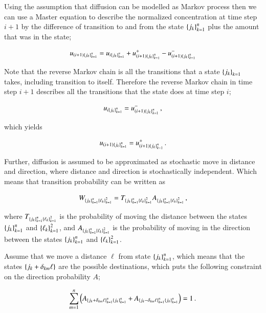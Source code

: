 \documentclass[11pt,english,a4paper]{article}
\begin{document}
\begin{flushleft}
Using the assumption that diffusion can be modelled as Markov process then we can use a Master equation to describe the normalized concentration at time step $i+1$ by the difference of transition to and from the state $\left\lbrace{j_k}\right\rbrace_{k=1}^n$ plus the amount that was in the state; 

\begin{align}
u_{(i+1)\left\lbrace{j_k}\right\rbrace_{k=1}^n} = u_{i\left\lbrace{j_k}\right\rbrace_{k=1}^n} +  u_{(i+1)\left\lbrace{j_k}\right\rbrace_{k=1}^n}^+ - u_{(i+1)\left\lbrace{j_k}\right\rbrace_{k=1}^n}^-
\label{eq_39}
\end{align} 

Note that the reverse Markov chain is all the transitions that a state $\left\lbrace{j_k}\right\rbrace_{k=1}$ takes, including transition to itself. Therefore the reverse Markov chain in time step $i+1$ describes all the transitions that the state does at time step $i$;

\begin{align*}
u_{i\left\lbrace{j_k}\right\rbrace_{k=1}^n} =  u_{(i+1)\left\lbrace{j_k}\right\rbrace_{k=1}^n}^- \,,
\end{align*}


which yields

\begin{align}
u_{(i+1)\left\lbrace{j_k}\right\rbrace_{k=1}^n} = u_{(i+1)\left\lbrace{j_k}\right\rbrace_{k=1}^n}^+ \,.
\label{eq_40}
\end{align}

Further, diffusion is assumed to be approximated as stochastic move in distance and direction, where distance and direction is stochastically independent. Which means that transition probability can be written as

\begin{align}
W_{\left\lbrace{j_k}\right\rbrace_{k=1}^n\left\lbrace{\ell_k}\right\rbrace_{k=1}^2} = T_{\left\lbrace{j_k}\right\rbrace_{k=1}^n\left\lbrace{\ell_k}\right\rbrace_{k=1}^2} A_{\left\lbrace{j_k}\right\rbrace_{k=1}^n\left\lbrace{\ell_k}\right\rbrace_{k=1}^2} \,,
\label{eq_41}
\end{align}

where $T_{\left\lbrace{j_k}\right\rbrace_{k=1}^n\left\lbrace{\ell_k}\right\rbrace_{k=1}^2}$ is the probability of moving the distance between the states $\left\lbrace{j_k}\right\rbrace_{k=1}^n$ and $\left\lbrace{\ell_k}\right\rbrace_{k=1}^2$, and $ A_{\left\lbrace{j_k}\right\rbrace_{k=1}^n\left\lbrace{\ell_k}\right\rbrace_{k=1}^2}$ is the probability of moving in the direction between the states $\left\lbrace{j_k}\right\rbrace_{k=1}^n$ and $\left\lbrace{\ell_k}\right\rbrace_{k=1}^2$. \linebreak

Assume that we move a distance $\ell$ from state $\left\lbrace{j_k}\right\rbrace_{k=1}^n$, which means that the states $\left\lbrace{j_k+\delta_{km}\ell}\right\rbrace$ are the possible destinations, which puts the following constraint on the direction probability $A$;

\begin{align}
\sum_{m=1}^n \left({A_{\left\lbrace{j_k+\delta_{km}\ell}\right\rbrace_{k=1}^n\left\lbrace{j_k}\right\rbrace_{k=1}^n}+A_{\left\lbrace{j_k-\delta_{km}\ell}\right\rbrace_{k=1}^n\left\lbrace{j_k}\right\rbrace_{k=1}^n}}\right) = 1 \,.
\label{eq_42}
\end{align}


\end{flushleft}
\end{document}
